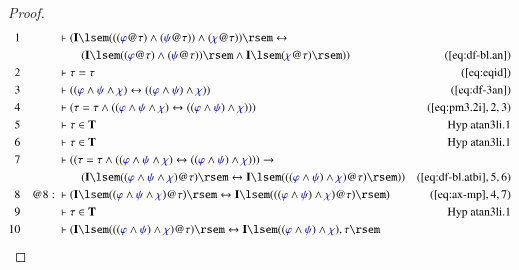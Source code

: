 \begin{proof}
\begin{align}
  1 &&  & \vdash ( \mathbf{I} \lsem ( ( ( \mw{\varphi} @ \tau ) \wedge (
      \mw{\psi} @ \tau ) ) \wedge ( \mw{\chi} @ \tau ) )
      \rsem \leftrightarrow  \notag \\ & & & \qquad
      ( \mathbf{I} \lsem ( (
      \mw{\varphi} @ \tau ) \wedge ( \mw{\psi} @ \tau ) )
      \rsem \wedge \mathbf{I} \lsem ( \mw{\chi} @ \tau )
      \rsem ) )&(\mbox{\ref{eq:df-bl.an}})\notag
  \\ 2 &&  & \vdash \tau = \tau&(\mbox{\ref{eq:eqid}})\notag
  \\ 3 &&  & \vdash ( ( \mw{\varphi} \wedge \mw{\psi} \wedge \mw{\chi} )
      \leftrightarrow ( ( \mw{\varphi} \wedge \mw{\psi} )
      \wedge \mw{\chi} ) )&(\mbox{\ref{eq:df-3an}})\notag
  \\ 4 &&  & \vdash ( \tau = \tau \wedge ( ( \mw{\varphi} \wedge \mw{\psi}
      \wedge \mw{\chi} ) \leftrightarrow ( ( \mw{\varphi}
      \wedge \mw{\psi} ) \wedge \mw{\chi} ) )
      )&(\mbox{\ref{eq:pm3.2i}},2,3)\notag
  \\ 5 &&  & \vdash \tau \in \mathbf{T}&\text{Hyp~atan3li.1}\notag%
  \\ 6 &&  & \vdash \tau \in \mathbf{T}&\text{Hyp~atan3li.1}\notag%
  \\ 7 &&  & \vdash ( ( \tau = \tau \wedge ( ( \mw{\varphi} \wedge \mw{\psi}
      \wedge \mw{\chi} ) \leftrightarrow ( ( \mw{\varphi}
      \wedge \mw{\psi} ) \wedge \mw{\chi} ) ) ) \rightarrow \notag \\ & & & \qquad
      ( \mathbf{I} \lsem ( ( \mw{\varphi} \wedge \mw{\psi}
      \wedge \mw{\chi} ) @ \tau ) \rsem \leftrightarrow
      \mathbf{I} \lsem ( ( ( \mw{\varphi} \wedge \mw{\psi}
      ) \wedge \mw{\chi} ) @ \tau ) \rsem )
      )&(\mbox{\ref{eq:df-bl.atbi}},5,6)\notag
  \\ 8 && @8:\  & \vdash ( \mathbf{I} \lsem ( ( \mw{\varphi} \wedge \mw{\psi}
      \wedge \mw{\chi} ) @ \tau ) \rsem \leftrightarrow
      \mathbf{I} \lsem ( ( ( \mw{\varphi} \wedge \mw{\psi}
      ) \wedge \mw{\chi} ) @ \tau ) \rsem
      )&(\mbox{\ref{eq:ax-mp}},4,7)\notag
  \\ 9 &&  & \vdash \tau \in \mathbf{T}&\text{Hyp~atan3li.1}\notag%
  \\ 10 &&  & \vdash ( \mathbf{I} \lsem ( ( ( \mw{\varphi} \wedge \mw{\psi} )
      \wedge \mw{\chi} ) @ \tau ) \rsem \leftrightarrow
      \mathbf{I} \lsem ( ( \mw{\varphi} \wedge \mw{\psi} )
      \wedge \mw{\chi} ) , \tau \rsem

\end{align}
\end{proof}

